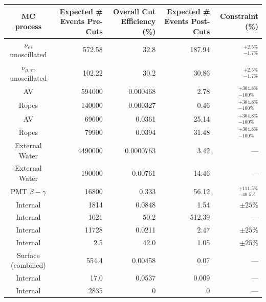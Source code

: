 \begin{table}[!th]
    \begin{center}
        \begin{tabulary}{\textwidth}{c R R R R}
            \hline
            MC process       & Expected \# Events Pre-Cuts & Overall Cut Efficiency (\%) & Expected \# Events Post-Cuts & Constraint (\%) \\ \hline \hline
            \beight{} $\nu_{e}$, unoscillated & 572.58 & 32.8       & 187.94 & $^{+2.5\%}_{-1.7\%}$ \\
            \beight{} $\nu_{\mu,\tau}$, unoscillated & 102.22 & 30.2       & 30.86  & $^{+2.5\%}_{-1.7\%}$ \\
            \hline
            AV              &\num{594000}&0.000468& 2.78   & $^{+304.8\%}_{-100\%}$ \\
            Ropes           &\num{140000}&0.000327& 0.46   & $^{+304.8\%}_{-100\%}$ \\
            AV              &\num{69600} & 0.0361 & 25.14  & $^{+304.8\%}_{-100\%}$ \\
            Ropes           &\num{79900} & 0.0394 & 31.48  & $^{+304.8\%}_{-100\%}$ \\
            External Water  &\num{4490000}&0.0000763& 3.42 & --- \\
            External Water  &\num{190000}& 0.00761&  14.46 & --- \\
            PMT $\beta-\gamma$           &\num{16800} & 0.333  &  56.12 & $^{+111.5\%}_{-40.5\%}$ \\
            \hline
            Internal      & \num{1814} & 0.0848 & 1.54   & $\pm 25\%$  \\
            Internal        & \num{1021} & 50.2   & 512.39 & --- \\
            Internal      & \num{11728}& 0.0211 & 2.47   & $\pm 25\%$ \\
            Internal        & \num{2.5}  & 42.0   & 1.05   & $\pm 25\%$ \\ \hline
            Surface \alphan{} (combined) & \num{554.4}& 0.00458& 0.07   & --- \\
            Internal \alphan{}           & \num{17.0} & 0.0537 & 0.009  & --- \\
            Internal        & \num{2835} & 0      & 0      & --- \\

\end{tabulary}
\end{center}
\end{table}
